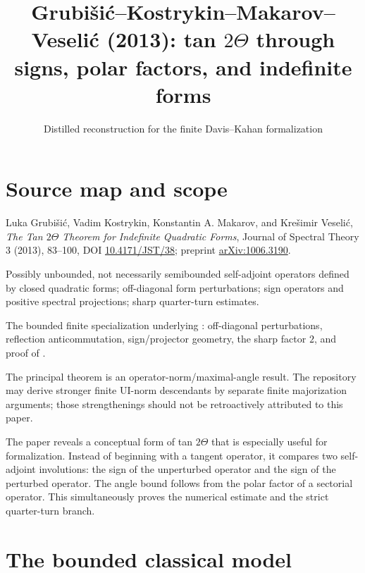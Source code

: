 
\title{Grubi\v{s}i\'c--Kostrykin--Makarov--Veseli\'c (2013): tan $2\Theta$ through signs, polar factors, and indefinite forms}
\author{}
\date{Distilled reconstruction for the finite Davis--Kahan formalization}

\maketitle

\section*{Source map and scope}
\begin{sourceguide}
\item[Primary source] Luka Grubi\v{s}i\'c, Vadim Kostrykin, Konstantin A. Makarov, and Kre\v{s}imir Veseli\'c, \emph{The Tan $2\Theta$ Theorem for Indefinite Quadratic Forms}, Journal of Spectral Theory 3 (2013), 83--100, DOI \href{https://doi.org/10.4171/JST/38}{10.4171/JST/38}; preprint \href{https://arxiv.org/abs/1006.3190}{arXiv:1006.3190}.
\item[Paper scope] Possibly unbounded, not necessarily semibounded self-adjoint operators defined by closed quadratic forms; off-diagonal form perturbations; sign operators and positive spectral projections; sharp quarter-turn estimates.
\item[Formalization target] The bounded finite specialization underlying : off-diagonal perturbations, reflection anticommutation, sign/projector geometry, the sharp factor $2$, and proof of .
\item[Source-faithful norm scope] The principal theorem is an operator-norm/maximal-angle result. The repository may derive stronger finite UI-norm descendants by separate finite majorization arguments; those strengthenings should not be retroactively attributed to this paper.
\end{sourceguide}

The paper reveals a conceptual form of tan $2\Theta$ that is especially useful for formalization. Instead of beginning with a tangent operator, it compares two self-adjoint involutions: the sign of the unperturbed operator and the sign of the perturbed operator. The angle bound follows from the polar factor of a sectorial operator. This simultaneously proves the numerical estimate and the strict quarter-turn branch.

\section{The bounded classical model}

